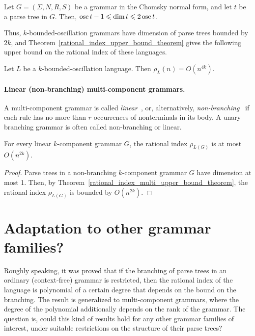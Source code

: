 \documentclass[runningheads]{llncs}
\DeclareMathOperator{\osc}{\textup{osc}}
\begin{document}
\begin{lemma}\label{boscdim}
Let $G = (\Sigma, N, R, S)$ be a grammar in the Chomsky normal form,
and let $t$ be a parse tree in $G$.
Then, $\osc t - 1 \leqslant \dim t \leqslant 2\osc t$.
\end{lemma}

Thus, $k$-bounded-oscillation grammars have dimension of parse trees bounded by $2k$,
and Theorem~\ref{rational_index_upper_bound_theorem} gives the following upper bound on the rational index
of these languages.
\begin{corollary}
Let $L$ be a $k$-bounded-oscillation language.
Then $\rho_{L}(n) = O(n^{4k})$.
\end{corollary}


\paragraph{Linear (non-branching) multi-component grammars.}
A multi-component grammar is called \emph{linear}~\cite{Engelfriet1997},
or, alternatively, \emph{non-branching}~\cite{KANAZAWA2019104449}
if each rule has no more than $r$ occurrences of nonterminals in its body. 
A unary branching grammar is often called non-branching or 
linear.
\begin{corollary}
For every linear $k$-component grammar $G$,
the rational index $\rho_{L(G)}$ is at most $O(n^{2k})$.
\end{corollary}
\begin{proof}
Parse trees in a non-branching $k$-component grammar $G$ have dimension at most 1.
Then, by Theorem~\ref{rational_index_multi_upper_bound_theorem},
the rational index $\rho_{L(G)}$ is bounded by $O(n^{2k})$.
\end{proof}






\section{Adaptation to other grammar families?}\label{section_adaptation}

Roughly speaking, it was proved that if the branching of parse trees
in an ordinary (context-free) grammar is restricted,
then the rational index of the language is polynomial
of a certain degree that depends on the bound on the branching.
The result is generalized to multi-component grammars,
where the degree of the polynomial additionally depends on the rank of the grammar.
The question is, could this kind of results
hold for any other grammar families of interest,
under suitable restrictions on the structure of their parse trees?
\end{document}
